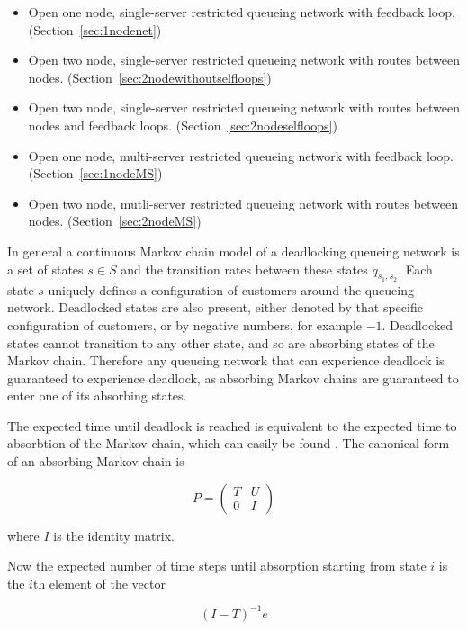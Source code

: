 \documentclass{article}
\numberwithin{equation}{section}
\begin{document}
\begin{itemize}
  \item Open one node, single-server restricted queueing network with feedback loop. (Section~\ref{sec:1nodenet})
  \item Open two node, single-server restricted queueing network with routes between nodes. (Section~\ref{sec:2nodewithoutselfloops})
  \item Open two node, single-server restricted queueing network with routes between nodes and feedback loops. (Section~\ref{sec:2nodeselfloops})
  \item Open one node, multi-server restricted queueing network with feedback loop. (Section~\ref{sec:1nodeMS})
  \item Open two node, mutli-server restricted queueing network with routes between nodes. (Section~\ref{sec:2nodeMS})
\end{itemize}

In general a continuous Markov chain model of a deadlocking queueing network is a set of states $s \in S$ and the transition rates between these states $q_{s_1,s_2}$.
Each state $s$ uniquely defines a configuration of customers around the queueing network.
Deadlocked states are also present, either denoted by that specific configuration of customers, or by negative numbers, for example $-1$.
Deadlocked states cannot transition to any other state, and so are absorbing states of the Markov chain.
Therefore any queueing network that can experience deadlock is guaranteed to experience deadlock, as absorbing Markov chains are guaranteed to enter one of its absorbing states.

The expected time until deadlock is reached is equivalent to the expected time to absorbtion of the Markov chain, which can easily be found \cite{stewart09}.
The canonical form of an absorbing Markov chain is

\begin{equation*}
P = \left(\begin{matrix} T & U\\ 0 & I \end{matrix} \right)
\end{equation*}

where $I$ is the identity matrix.

Now the expected number of time steps until absorption starting from state $i$ is the $i\text{th}$ element of the vector

\begin{equation} \label{eq:abs_probs}
  (I - T)^{-1}e
\end{equation}
\end{document}
